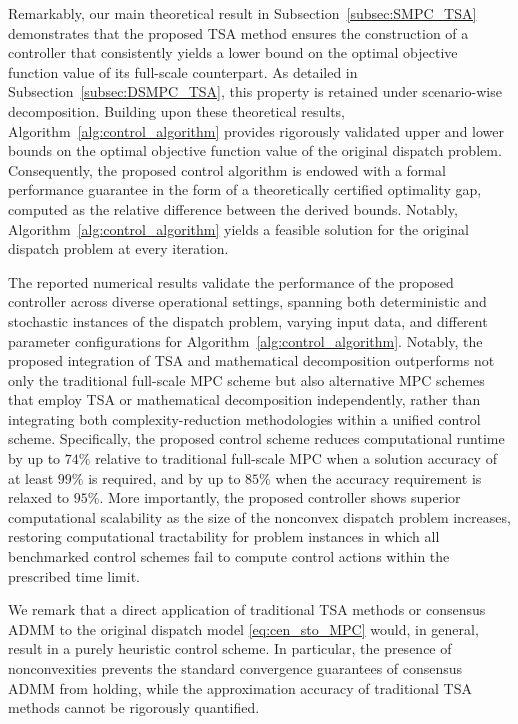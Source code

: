 \documentclass[a4paper,fleqn]{cas-sc}
\begin{document}
Remarkably, our main theoretical result in Subsection~\ref{subsec:SMPC_TSA} demonstrates that the proposed TSA method ensures the construction of a controller that consistently yields a lower bound on the optimal objective function value of its full-scale counterpart.
As detailed in Subsection~\ref{subsec:DSMPC_TSA}, this property is retained under scenario-wise decomposition.
Building upon these theoretical results, Algorithm~\ref{alg:control_algorithm} provides rigorously validated upper and lower bounds on the optimal objective function value of the original dispatch problem.
Consequently, the proposed control algorithm is endowed with a formal performance guarantee in the form of a theoretically certified optimality gap, computed as the relative difference between the derived bounds.
Notably, Algorithm~\ref{alg:control_algorithm} yields a feasible solution for the original dispatch problem at every iteration.

The reported numerical results validate the performance of the proposed controller across diverse operational settings, 
spanning both deterministic and stochastic instances of the dispatch problem, varying input data, and different parameter configurations for Algorithm~\ref{alg:control_algorithm}.
Notably, the proposed integration of TSA and mathematical decomposition outperforms not only the traditional full-scale MPC scheme
but also alternative MPC schemes that employ TSA or mathematical decomposition independently, rather than integrating both complexity-reduction methodologies within a unified control scheme.
Specifically, the proposed control scheme reduces computational runtime by up to $74\%$ relative to traditional full-scale MPC when a solution accuracy of at least $99\%$ is required, and by up to $85\%$ when the accuracy requirement is relaxed to $95\%$.
More importantly, the proposed controller shows superior computational scalability as the size of the nonconvex dispatch problem increases, 
restoring computational tractability for problem instances in which all benchmarked control schemes fail to compute control actions within the prescribed time limit.

We remark that a direct application of traditional TSA methods or consensus ADMM to the original dispatch model \eqref{eq:cen_sto_MPC} would, in general, result in a purely heuristic control scheme.
In particular, the presence of nonconvexities prevents the standard convergence guarantees of consensus ADMM from holding,
while the approximation accuracy of traditional TSA methods cannot be rigorously quantified.
\end{document}
